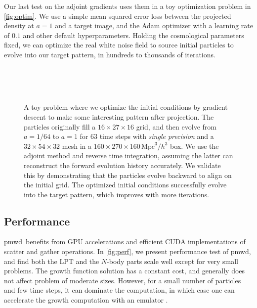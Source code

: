 \documentclass[modern, trackchanges, dvipsnames]{aastex631}
\newcommand{\pmwd}{{\usefont{T1}{nova}{m}{sl}pmwd}}
\newcommand{\Mpc}{\mathrm{Mpc}}
\begin{document}
Our last test on the adjoint gradients uses them in a toy optimization
problem in \autoref{fig:optim}.
We use a simple mean squared error loss between the projected density at
$a=1$ and a target image, and the Adam optimizer \citep{Adam} with a
learning rate of $0.1$ and other default hyperparameters.
Holding the cosmological parameters fixed, we can optimize the real
white noise field to source initial particles to evolve into our target
pattern, in hundreds to thousands of iterations.


\begin{figure}[t]
\centering
{}
\hfill
{}
\\
\hfill
{}
\\
\hfill
{}
\\
\caption{A toy problem where we optimize the initial conditions by
gradient descent to make some interesting pattern after projection.
The particles originally fill a $16\times27\times16$ grid, and then
evolve from $a=1/64$ to $a=1$ for 63 time steps with \emph{single
precision} and a $32\times54\times32$ mesh in a $160\times270\times160
\, \Mpc^3/h^3$ box.
We use the adjoint method and reverse time integration, assuming the
latter can reconstruct the forward evolution history accurately.
We validate this by demonstrating that the particles evolve backward to
align on the initial grid.
The optimized initial conditions successfully evolve into the target
pattern, which improves with more iterations.
}
\label{fig:optim}
\end{figure}


\vspace{1em}
\subsection{Performance}

\pmwd\ benefits from GPU accelerations and efficient CUDA
implementations of scatter and gather operations.
In \autoref{fig:perf}, we present performance test of \pmwd, and find
both the LPT and the $N$-body parts scale well except for very small
problems.
The growth function solution has a constant cost, and generally does not
affect problem of moderate sizes.
However, for a small number of particles and few time steps, it can
dominate the computation, in which case one can accelerate the growth
computation with an emulator \citep{KwanModiEtAl2022}.
\end{document}

